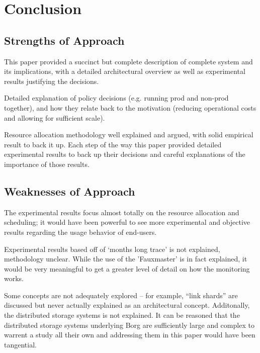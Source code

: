 \documentclass[runningheads,a4paper]{llncs}
\begin{document}
\section{Conclusion}

\subsection{Strengths of Approach}
This paper provided a succinct but complete description of complete system and its implications, with a detailed architectural overview as well as experimental results justifying the decisions. 

Detailed explanation of policy decisions (e.g. running prod and non-prod together), and how they relate back to the motivation (reducing operational costs and allowing for sufficient scale).

Resource allocation methodology well explained and argued, with solid empirical result to back it up.  Each step of the way this paper provided detailed experimental results to back up their decisions and careful explanations of the importance of those results.  

\subsection{Weaknesses of Approach}
The experimental results focus almost totally on the resource allocation and scheduling; it would have been powerful to see more experimental and objective results regarding the usage behavior of end-users.

Experimental results based off of ‘months long trace’ is not explained, methodology unclear.  While the use of the 'Fauxmaster' is in fact explained, it would be very meaningful to get a greater level of detail on how the monitoring works.

Some concepts are not adequately explored -- for example, “link shards” are discussed but never actually explained as an architectural concept.  Additonally, the distributed storage systems is not explained.  It can be reasoned that the distributed storage systems underlying Borg are sufficiently large and complex to warrent a study all their own and addressing them in this paper would have been tangential.  




\end{document}
